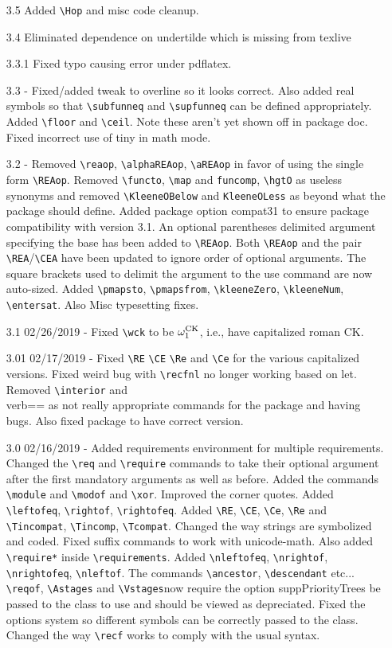 \documentclass[leqno,11pt]{amsart}
\begin{document}
\begin{itemize}
	\item[3.5] Added \verb=\Hop= and misc code cleanup.
	\item[3.4] Eliminated dependence on undertilde which is missing from texlive
	\item[3.3.1] Fixed typo causing error under pdflatex.
	\item[3.3]  - Fixed/added tweak to overline so it looks correct.  Also added real symbols so that \verb=\subfunneq= and \verb=\supfunneq= can be defined appropriately.  Added \verb=\floor= and \verb=\ceil=.  Note these aren't yet shown off in package doc.  Fixed incorrect use of tiny in math mode.
	\item[3.2]	- Removed \verb=\reaop=, \verb=\alphaREAop=, \verb=\aREAop= in favor of using the single form \verb=\REAop=.  Removed \verb=\functo=, \verb=\map= and \verb=funcomp=, \verb=\hgtO= as useless synonyms and removed \verb=\KleeneOBelow= and \verb=KleeneOLess= as beyond what the package should define. Added package option compat31 to ensure package compatibility with version 3.1.  An optional parentheses delimited argument specifying the base has been added to  \verb=\REAop=.  Both \verb=\REAop= and the pair \verb=\REA=/\verb=\CEA= have been updated to ignore order of optional arguments.  The square brackets used to delimit the argument to the use command are now auto-sized.  Added \verb=\pmapsto=, \verb=\pmapsfrom=, \verb=\kleeneZero=, \verb=\kleeneNum=, \verb=\entersat=.  Also Misc typesetting fixes.  
	\item[3.1]  02/26/2019 - Fixed \verb=\wck= to be \( \omega^{\mathrm{CK}}_1 \), i.e., have capitalized roman CK.
	\item[3.01] 02/17/2019 - Fixed \verb=\RE= \verb=\CE= \verb=\Re= and \verb=\Ce= for the various capitalized versions.  Fixed weird bug with \verb=\recfnl= no longer working based on let.  Removed \verb=\interior= and \\verb=\closure= as not really appropriate commands for the package and having bugs.  Also fixed package to have correct version.
	\item[3.0] 02/16/2019 - Added requirements environment for multiple requirements.  Changed the \verb=\req= and \verb=\require= commands to take their optional argument after the first mandatory arguments as well as before.  Added the commands \verb=\module= and \verb=\modof= and \verb=\xor=.  Improved the corner quotes. Added \verb=\leftofeq=, \verb=\rightof=, \verb=\rightofeq=.  Added \verb=\RE=, \verb=\CE=, \verb=\Ce=, \verb=\Re= and  \verb=\Tincompat=, \verb=\Tincomp=, \verb=\Tcompat=.  Changed the way strings are symbolized and coded.  Fixed suffix commands to work with unicode-math.  Also added \verb=\require*= inside \verb=\requirements=. Added \verb=\nleftofeq=, \verb=\nrightof=, \verb=\nrightofeq=, \verb=\nleftof=.  The commands \verb=\ancestor=, \verb=\descendant= etc... \verb=\reqof=, \verb=\Astages= and \verb=\Vstages=now require the option suppPriorityTrees be passed to the class to use and should be viewed as depreciated.  Fixed the options system so different symbols can be correctly passed to the class.    Changed the way \verb=\recf= works to comply with the usual syntax.

\end{itemize}
\end{document}
